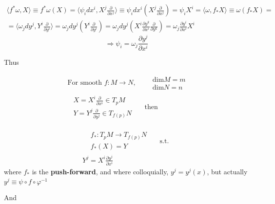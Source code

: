 \[
\begin{gathered}
\langle f^* \omega, X \rangle \equiv f^* \omega(X) = \langle \psi_i dx^i, X^j \frac{\partial }{ \partial x^j} \rangle \equiv \psi_i dx^i (X^j \frac{ \partial }{ \partial x^j} ) = \psi_i X^i = \langle \omega , f_* X \rangle  \equiv \omega(f_* X) = \\
= \langle \omega_j dy^j , Y^i \frac{ \partial }{ \partial y^i} \rangle = \omega_j dy^j ( Y^i \frac{\partial }{ \partial y^i} ) = \omega_j dy^j \left( X^i \frac{ \partial y^k}{ \partial x^i } \frac{ \partial }{ \partial y^k } \right) = \omega_j \frac{\partial y^i }{ \partial x^i } X^i 
\end{gathered}
\]
\[
\Longrightarrow \psi_i = \omega_j \frac{\partial y^j}{ \partial x^i}
\]

Thus
\begin{theorem} 
\[
\begin{gathered}
	\text{ For smooth } f: M \to N, \quad \,  \begin{aligned} & \text{dim}M = m \\ & \text{dim} N = n \end{aligned} \\
	\begin{aligned}
		& X = X^i \frac{\partial }{ \partial x^i} \in T_p M \\
		& Y = Y^j \frac{\partial }{ \partial y^j} \in T_{f(p)} N 		
	\end{aligned} \quad \, \text{ then }
\end{gathered} 
\]


\begin{equation}
	\boxed{
		\begin{gathered} 
\begin{aligned}
	& f_* : T_pM \to T_{f(p)} N \\
	& f_* (X) = Y 
\end{aligned} \quad \, \text{ s.t. } \\
Y^j = X^i \frac{\partial y^j}{\partial x^i} 
\end{gathered}
}
\end{equation}
where $f_*$ is the \textbf{push-forward}, and where colloquially, $y^j = y^j(x)$, but actually $y^j \equiv \psi \circ f \circ \varphi^{-1}$
\end{theorem} 

And


